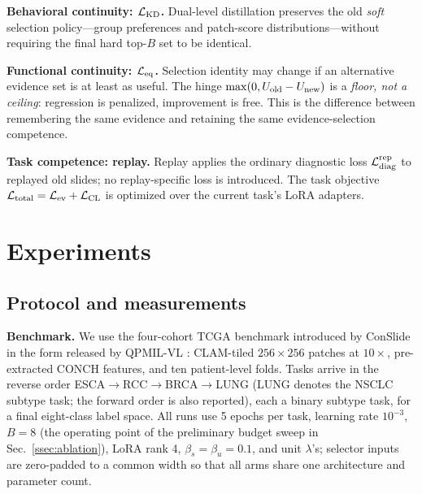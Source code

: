 \documentclass{article}
\def\L{{\cal L}}
\begin{document}
\textbf{Behavioral continuity: $\L_{\rm KD}$.}
Dual-level distillation preserves the old \emph{soft} selection policy---group preferences and patch-score distributions---without requiring the final hard top-$B$ set to be identical.

\textbf{Functional continuity: $\L_{\rm eq}$.}
Selection identity may change if an alternative evidence set is at least as useful. The hinge $\max(0,U_{\rm old}-U_{\rm new})$ is a \emph{floor, not a ceiling}: regression is penalized, improvement is free. This is the difference between remembering the same evidence and retaining the same evidence-selection competence.

\textbf{Task competence: replay.}
Replay applies the ordinary diagnostic loss $\L_{\mathrm{diag}}^{\mathrm{rep}}$ to replayed old slides; no replay-specific loss is introduced. The task objective $\L_{\mathrm{total}}=\L_{\mathrm{ev}}+\L_{\mathrm{CL}}$ is optimized over the current task's LoRA adapters.

\section{Experiments}
\label{sec:exp}

\subsection{Protocol and measurements}

\textbf{Benchmark.}
We use the four-cohort TCGA benchmark introduced by ConSlide \cite{huang2023conslide} in the form released by QPMIL-VL \cite{gou2025qpmil}: CLAM-tiled $256\times256$ patches at $10\times$, pre-extracted CONCH features, and ten patient-level folds. Tasks arrive in the reverse order ESCA$\rightarrow$RCC$\rightarrow$BRCA$\rightarrow$LUNG (LUNG denotes the NSCLC subtype task; the forward order is also reported), each a binary subtype task, for a final eight-class label space. All runs use 5 epochs per task, learning rate $10^{-3}$, $B=8$ (the operating point of the preliminary budget sweep in Sec.~\ref{ssec:ablation}), LoRA rank 4, $\beta_s{=}\beta_u{=}0.1$, and unit $\lambda$'s; selector inputs are zero-padded to a common width so that all arms share one architecture and parameter count.
\end{document}
